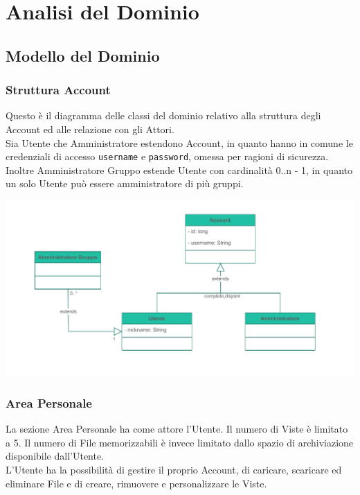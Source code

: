 \section*{Analisi del Dominio}
{}

\subsection*{Modello del Dominio}

\subsubsection*{Struttura Account}
{}
\vspace{0.5cm}
Questo è il diagramma delle classi del dominio relativo alla struttura degli Account ed alle relazione con gli Attori. \\
Sia Utente che Amministratore estendono Account, in quanto hanno in comune le credenziali di accesso \verb|username| e \verb|password|, omessa per ragioni di sicurezza.\\
Inoltre Amministratore Gruppo estende Utente con cardinalità 0..n - 1, in quanto un solo Utente può essere amministratore di più gruppi.

\vspace{0.5cm}
\begin{adjustwidth}{-2.5cm}{0cm}
\includegraphics[scale=1]{dominio/Dominio-Struttura Account.drawio.pdf}
\end{adjustwidth}

\pagebreak
\subsubsection*{Area Personale}
{}
\vspace{0.5cm}
La sezione Area Personale ha come attore l'Utente. Il numero di Viste è limitato a 5. Il numero di File memorizzabili è invece limitato dallo spazio di archiviazione disponibile dall'Utente.\\
L'Utente ha la possibilità di gestire il proprio Account, di caricare, scaricare ed eliminare File e di creare, rimuovere e personalizzare le Viste.\\
\vspace{0.5cm}

